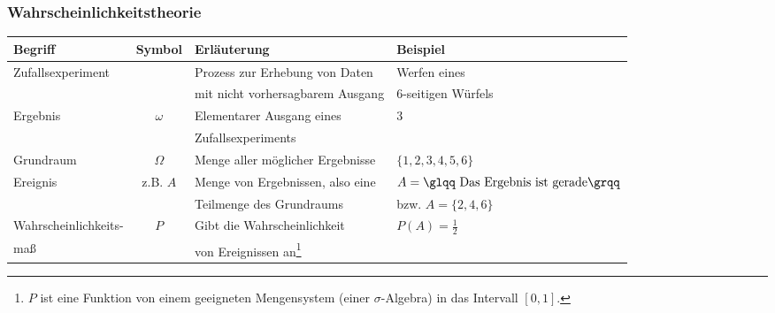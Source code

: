
\begin{frame}
\frametitle{Wahrscheinlichkeitstheorie}
\begin{tabular}{l|c|l|l}
Begriff & Symbol & Erläuterung & Beispiel\\
\hline
\pause
Zufallsexperiment & & Prozess zur Erhebung von Daten  &Werfen eines \\
				& &mit nicht vorhersagbarem Ausgang	&			6-seitigen Würfels\\[3pt]
\pause
Ergebnis &$\omega$& Elementarer Ausgang eines  & 3\\
	&  & Zufallsexperiments & \\[3pt]
\pause
Grundraum &$\Omega$& Menge aller möglicher Ergebnisse & $\{1,2,3,4,5,6\}$\\[3pt]
\pause
Ereignis&z.B. $A$& Menge von Ergebnissen, also eine  & $A = \text{\glqq Das Ergebnis ist gerade\grqq}$ \\	
		& & Teilmenge des Grundraums & bzw. $A=\{2,4,6\}$\\[3pt]
\pause
Wahrscheinlichkeits- & $P$ & Gibt die Wahrscheinlichkeit  & $P(A) = \frac{1}{2}$\\
maß & & von Ereignissen an\footnote{$P$ ist eine Funktion von einem geeigneten Mengensystem (einer $\sigma$-Algebra) in das Intervall $[0,1]$.} & \\
\end{tabular}
\end{frame}

